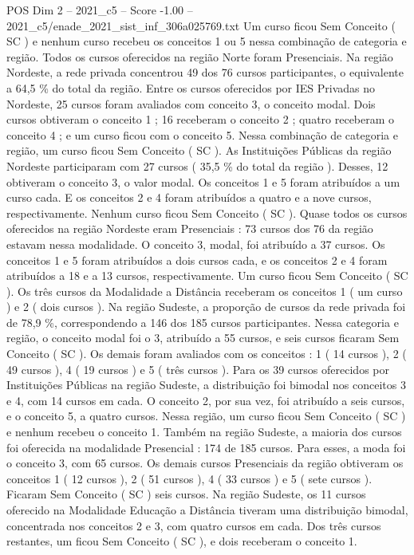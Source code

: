 \begin{textsample}{POS Dim 2 – 2021\_c5 – Score -1.00 – 2021\_c5/enade\_2021\_sist\_inf\_306a025769.txt}
Um curso ficou Sem Conceito ( SC ) e nenhum curso recebeu os conceitos 1 ou 5 nessa combinação de categoria e região.
Todos os cursos oferecidos na região Norte foram Presenciais.
Na região Nordeste, a rede privada concentrou 49 dos 76 cursos participantes, o equivalente a 64,5 \% do total da região.
Entre os cursos oferecidos por IES Privadas no Nordeste, 25 cursos foram avaliados com conceito 3, o conceito modal.
Dois cursos obtiveram o conceito 1 ; 16 receberam o conceito 2 ; quatro receberam o conceito 4 ; e um curso ficou com o conceito 5.
Nessa combinação de categoria e região, um curso ficou Sem Conceito ( SC ).
As Instituições Públicas da região Nordeste participaram com 27 cursos ( 35,5 \% do total da região ).
Desses, 12 obtiveram o conceito 3, o valor modal.
Os conceitos 1 e 5 foram atribuídos a um curso cada.
E os conceitos 2 e 4 foram atribuídos a quatro e a nove cursos, respectivamente.
Nenhum curso ficou Sem Conceito ( SC ).
Quase todos os cursos oferecidos na região Nordeste eram Presenciais : 73 cursos dos 76 da região estavam nessa modalidade.
O conceito 3, modal, foi atribuído a 37 cursos.
Os conceitos 1 e 5 foram atribuídos a dois cursos cada, e os conceitos 2 e 4 foram atribuídos a 18 e a 13 cursos, respectivamente.
Um curso ficou Sem Conceito ( SC ).
Os três cursos da Modalidade a Distância receberam os conceitos 1 ( um curso ) e 2 ( dois cursos ).
Na região Sudeste, a proporção de cursos da rede privada foi de 78,9 \%, correspondendo a 146 dos 185 cursos participantes.
Nessa categoria e região, o conceito modal foi o 3, atribuído a 55 cursos, e seis cursos ficaram Sem Conceito ( SC ).
Os demais foram avaliados com os conceitos : 1 ( 14 cursos ), 2 ( 49 cursos ), 4 ( 19 cursos ) e 5 ( três cursos ).
Para os 39 cursos oferecidos por Instituições Públicas na região Sudeste, a distribuição foi bimodal nos conceitos 3 e 4, com 14 cursos em cada.
O conceito 2, por sua vez, foi atribuído a seis cursos, e o conceito 5, a quatro cursos.
Nessa região, um curso ficou Sem Conceito ( SC ) e nenhum recebeu o conceito 1.
Também na região Sudeste, a maioria dos cursos foi oferecida na modalidade Presencial : 174 de 185 cursos.
Para esses, a moda foi o conceito 3, com 65 cursos.
Os demais cursos Presenciais da região obtiveram os conceitos 1 ( 12 cursos ), 2 ( 51 cursos ), 4 ( 33 cursos ) e 5 ( sete cursos ).
Ficaram Sem Conceito ( SC ) seis cursos.
Na região Sudeste, os 11 cursos oferecido na Modalidade Educação a Distância tiveram uma distribuição bimodal, concentrada nos conceitos 2 e 3, com quatro cursos em cada.
Dos três cursos restantes, um ficou Sem Conceito ( SC ), e dois receberam o conceito 1.

\end{textsample}
